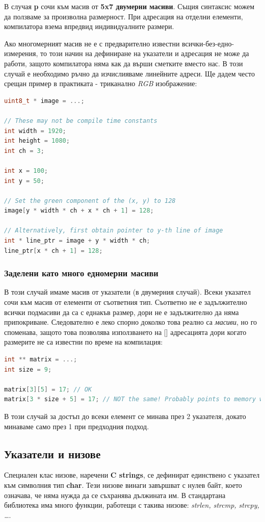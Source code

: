 \documentclass[fleqn,12pt]{article}
\begin{document}
В случая \textbf{p} сочи към масив от \textbf{5x7 двумерни масиви}. Същия синтаксис можем да ползваме за произволна размерност.
При адресация на отделни елементи, компилатора взема впредвид индивидуалните размери.

Ако многомерният масив не е с предварително известни всички-без-едно-измерения, то този начин на дефиниране на указатели и адресация
не може да работи, защото компилатора няма как да върши сметките вместо нас. В този случай е необходимо ръчно да изчислияваме линейните адреси.
Ще дадем често срещан пример в практиката - триканално \textit{RGB} изображение:
\begin{lstlisting}[language=C++, caption=Multidimensional pointers]
uint8_t * image = ...;

// These may not be compile time constants
int width = 1920;
int height = 1080;
int ch = 3;

int x = 100;
int y = 50;

// Set the green component of the (x, y) to 128
image[y * width * ch + x * ch + 1] = 128;

// Alternatively, first obtain pointer to y-th line of image
int * line_ptr = image + y * width * ch;
line_ptr[x * ch + 1] = 128;
\end{lstlisting}

\subsubsection{Заделени като много едномерни масиви}
В този случай имаме масив от указатели (в двумерния случай). Всеки указател сочи към масив от елементи от съответния тип.
Съответно не е задължително всички подмасиви да са с еднакъв размер, дори не е задължително да няма припокриване.
Следователно е леко спорно доколко това реално са \textit{масиви}, но го споменава, защото това позволява използването
на [] адресацията дори когато размерите не са известни по време на компилация:

\begin{lstlisting}[language=C++, caption=Multidimensional pointers 2]
int ** matrix = ...;
int size = 9;

matrix[3][5] = 17; // OK
matrix[3 * size + 5] = 17; // NOT the same! Probably points to memory we shouldn't touch
\end{lstlisting}

В този случай за достъп до всеки елемент се минава през 2 указателя, докато минаваме само през 1 при предходния подход.

\subsection{Указатели и низове}
Специален клас низове, наречени \textbf{C strings}, се дефинират единствено с указател към символния тип \textbf{char}.
Тези низове винаги завършват с нулев байт, което означава, че няма нужда да се съхранява дължината им.
В стандартана библиотека има много функции, работещи с такива низове: \textit{strlen, strcmp, strcpy, \dots}.
\end{document}
